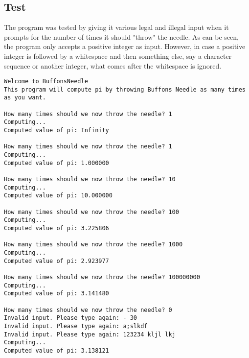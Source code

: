 \documentclass{scrartcl}
\begin{document}
\subsection*{Test}
The program was tested by giving it various legal and illegal input when 
it prompts for the number of times it should "throw" the needle. As can
be seen, the program only accepts a positive integer as input. However,
in case a positive integer is followed by a whitespace and then something
else, say a character sequence or another integer, what comes after the
whitespace is ignored.
\begin{Verbatim}
Welcome to BuffonsNeedle
This program will compute pi by throwing Buffons Needle as many times as you want.

How many times should we now throw the needle? 1
Computing...
Computed value of pi: Infinity

How many times should we now throw the needle? 1
Computing...
Computed value of pi: 1.000000

How many times should we now throw the needle? 10
Computing...
Computed value of pi: 10.000000

How many times should we now throw the needle? 100
Computing...
Computed value of pi: 3.225806

How many times should we now throw the needle? 1000
Computing...
Computed value of pi: 2.923977

How many times should we now throw the needle? 100000000
Computing...
Computed value of pi: 3.141480

How many times should we now throw the needle? 0
Invalid input. Please type again: - 30
Invalid input. Please type again: a;slkdf
Invalid input. Please type again: 123234 kljl lkj
Computing...
Computed value of pi: 3.138121
\end{Verbatim}
\end{document}
